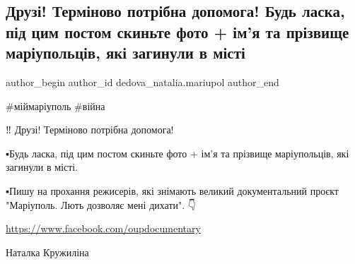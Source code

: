  
 
 
 
 

\subsection{Друзі! Терміново потрібна допомога! Будь ласка, під цим постом скиньте фото + ім'я та прізвище маріупольців, які загинули в місті}
\label{sec:10_01_2023.fb.dedova_natalia.mariupol.1.druz__term_novo_pot}

\ifcmt
 author_begin
   author_id dedova_natalia.mariupol
 author_end
\fi

\#міймаріуполь \#війна

‼️ Друзі! Терміново потрібна допомога! 🙏

▪️Будь ласка, під цим постом скиньте фото + ім'я та прізвище маріупольців, які загинули в місті. 

▪️Пишу на прохання режисерів, які знімають великий документальний проєкт "Маріуполь. Лють дозволяє мені дихати". 👇

\url{https://www.facebook.com/oupdocumentary}

Наталка Кружиліна

💙💛

